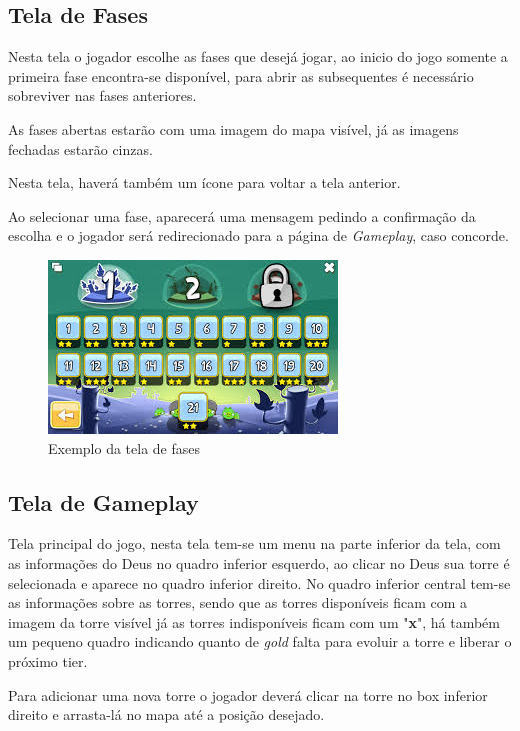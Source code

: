\documentclass[11pt]{article} %
\begin{document}
\subsection{Tela de Fases}
Nesta tela o jogador escolhe as fases que desejá jogar, ao inicio do jogo somente a primeira fase encontra-se disponível, para abrir as subsequentes é necessário sobreviver nas fases anteriores.

As fases abertas estarão com uma imagem do mapa visível, já as imagens fechadas estarão cinzas.

Nesta tela, haverá também um ícone para voltar a tela anterior.  

Ao selecionar uma fase, aparecerá uma mensagem pedindo a confirmação da escolha e o jogador será redirecionado para a página de \textit{Gameplay}, caso concorde.

\begin{figure}[!htp]
\centering
\includegraphics[scale=1]{res/fases.jpg}
\caption{Exemplo da tela de fases}
\label{Fases}
\end{figure}

\newpage

\subsection{Tela de Gameplay}

Tela principal do jogo, nesta tela tem-se um menu na parte inferior da tela, com as informações do Deus no quadro inferior esquerdo, ao clicar no Deus sua torre é selecionada e aparece no quadro inferior direito.
No quadro inferior central tem-se as informações sobre as torres, sendo que as torres disponíveis ficam com a imagem da torre visível já as torres indisponíveis ficam com um "\textbf{x}", há também um pequeno quadro indicando quanto de \textit{gold} falta para evoluir a torre e liberar o próximo tier.

Para adicionar uma nova torre o jogador deverá clicar na torre no box inferior direito e arrasta-lá no mapa até a posição desejado.
\end{document}
